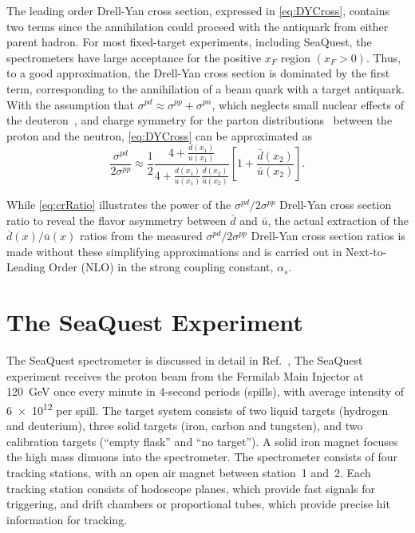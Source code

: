 \documentclass[reprint,aps,unsortedaddress,superscriptaddress,prl,floatfix,showpacs,linenumbers,final]{revtex4-2}
\begin{document}
The leading order Drell-Yan cross section, expressed in \cref{eq:DYCross},
contains two terms since the annihilation could proceed with the antiquark from either parent hadron.
For most fixed-target experiments, including SeaQuest,
the spectrometers have large acceptance for the positive $x_F$  region $\left(x_F > 0\right)$.
Thus, to a good approximation, the Drell-Yan cross section is dominated by the first term,
corresponding to the annihilation of a beam quark with a target antiquark.
With the assumption that $\sigma^{pd} \approx \sigma^{pp} + \sigma^{pn}$,
which neglects small nuclear effects of the deuteron~\cite{kumano1998,ehlers2014},
and charge symmetry for the parton distributions~\cite{londergan2010} between the proton and the neutron,
\cref{eq:DYCross} can be approximated as
\begin{equation}
	\frac{\sigma^{pd}}{2\sigma^{pp}} \approx
	\frac{1}{2} \frac{4+\frac{d\left(x_1\right)}{u\left(x_1\right)}}{4+\frac{d\left(x_1\right)}{u\left(x_1\right)}\frac{\bar d\left(x_2\right)}{\bar u\left(x_2\right)}}
	\left[1+\frac{\bar d\left(x_2\right)}{\bar u\left(x_2\right)}\right].
	\label{eq:crRatio}
\end{equation}

While \cref{eq:crRatio} illustrates the power of the $\sigma^{pd}/2\sigma^{pp}$ Drell-Yan cross section
ratio to reveal the flavor asymmetry between $\bar d$ and $\bar u$,
the actual extraction of the $\bar d\left(x\right) / \bar u\left(x\right)$ ratios
from the measured $\sigma^{pd}/ 2 \sigma^{pp}$ Drell-Yan cross section ratios is
made without these simplifying approximations and is carried out in Next-to-Leading Order (NLO)
in the strong coupling constant, $\alpha_s$. %

\section{The SeaQuest Experiment}
\label{sec:seaquest_spectrometer}
The SeaQuest spectrometer is  discussed in detail in Ref.~\cite{aidala2019},
The SeaQuest experiment receives the  proton beam from the Fermilab Main Injector at \SI{120}{\GeV}
once every minute in 4-second periods (spills), with average intensity of \num{6e12} per spill.
The target system consists of two liquid targets (hydrogen and deuterium),
three solid targets (iron, carbon and tungsten), and two calibration targets (``empty flask'' and ``no target'').
A solid iron magnet focuses the high mass dimuons into the spectrometer.
The spectrometer consists of four tracking stations, with an open air magnet between station~1 and~2.
Each tracking station consists of hodoscope planes, which provide fast signals for triggering,
and drift chambers or proportional tubes, which provide precise hit information for tracking.
\end{document}
